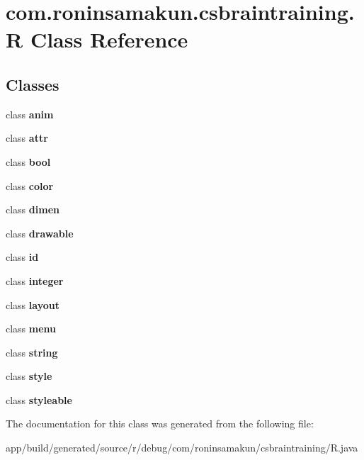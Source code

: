 \section{com.\+roninsamakun.\+csbraintraining.\+R Class Reference}
\label{classcom_1_1roninsamakun_1_1csbraintraining_1_1_r}
\subsection*{Classes}
\begin{DoxyCompactItemize}
\item 
class {\bfseries anim}
\item 
class {\bfseries attr}
\item 
class {\bfseries bool}
\item 
class {\bfseries color}
\item 
class {\bfseries dimen}
\item 
class {\bfseries drawable}
\item 
class {\bfseries id}
\item 
class {\bfseries integer}
\item 
class {\bfseries layout}
\item 
class {\bfseries menu}
\item 
class {\bfseries string}
\item 
class {\bfseries style}
\item 
class {\bfseries styleable}
\end{DoxyCompactItemize}


The documentation for this class was generated from the following file\+:\begin{DoxyCompactItemize}
\item 
app/build/generated/source/r/debug/com/roninsamakun/csbraintraining/R.\+java\end{DoxyCompactItemize}
